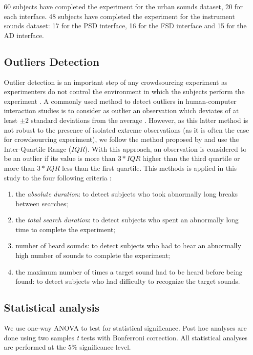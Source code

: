 \documentclass{aes2e}
\begin{document}
60 subjects have completed the experiment for the urban sounds dataset, 20 for each interface. 48 subjects have completed the experiment for the instrument sounds dataset: 17 for the PSD interface, 16 for the FSD interface and 15 for the AD interface.

\subsection{Outliers Detection}

Outlier detection is an important step of any crowdsourcing experiment as experimenters do not control the environment in which the subjects perform the experiment \cite{komarov2013crowdsourcing,buchholz2011crowdsourcing}. A commonly used method to detect outliers in  human-computer interaction studies is to consider as outlier an observation which deviates of at least $\pm2$ standard deviations from the average \cite{komarov2013crowdsourcing}. However, as this latter method is not robust to the presence of isolated extreme observations (as it is often the case for crowdsourcing experiment), we follow the  method proposed by \cite{komarov2013crowdsourcing} and use the Inter-Quartile Range ($IQR$). With this approach, an observation is considered to be an outlier if its value is more than $3*IQR$ higher than the third quartile or more than $3*IQR$ less than the first quartile. This methods is applied in this study to the four following criteria :

\begin{enumerate}
\item the \textit{absolute duration}: to detect subjects who took abnormally long breaks between searches;
\item the \textit{total search duration}: to detect subjects who spent an abnormally long time to complete the experiment;
\item number of heard sounds: to detect subjects who had to hear an abnormally high number of sounds to complete the experiment;
\item the maximum number of times a target sound had to be heard before being found: to detect subjects who had difficulty to recognize the target sounds.
\end{enumerate}

\subsection{Statistical analysis}

We use one-way ANOVA to test for statistical significance. Post hoc analyses are done using two samples \textit{t} tests with Bonferroni correction. All statistical analyses are performed at the 5\% significance level.
\end{document}
